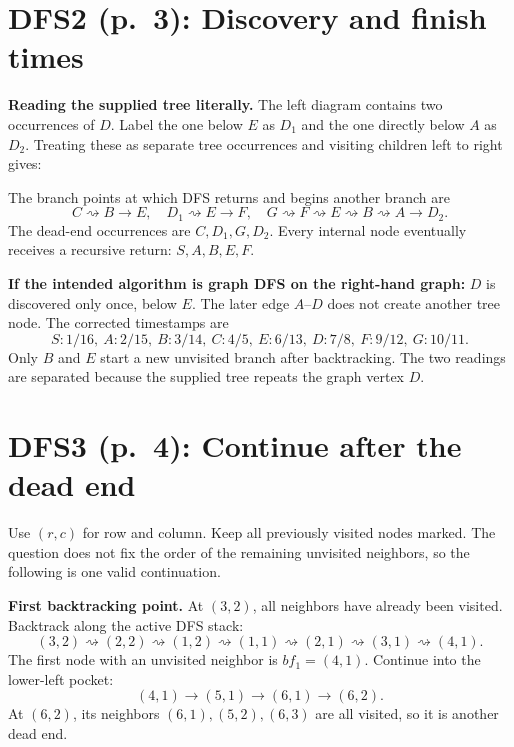 \documentclass[11pt,a4paper]{article}
\newcommand{\question}[2]{\section*{#1: #2}}
\begin{document}
\newpage
\question{DFS2 (p.\ 3)}{Discovery and finish times}
\textbf{Reading the supplied tree literally.} The left diagram contains two occurrences of $D$. Label the one below $E$ as $D_1$ and the one directly below $A$ as $D_2$. Treating these as separate tree occurrences and visiting children left to right gives:
\begin{center}\end{center}
The branch points at which DFS returns and begins another branch are
\[
C\rightsquigarrow\boxed{B}\to E,\quad D_1\rightsquigarrow\boxed{E}\to F,
\quad G\rightsquigarrow F\rightsquigarrow E\rightsquigarrow B\rightsquigarrow\boxed{A}\to D_2.
\]
The dead-end occurrences are $C,D_1,G,D_2$. Every internal node eventually receives a recursive return: $S,A,B,E,F$.

\textbf{If the intended algorithm is graph DFS on the right-hand graph:} $D$ is discovered only once, below $E$. The later edge $A$--$D$ does not create another tree node. The corrected timestamps are
\[
S:1/16,\ A:2/15,\ B:3/14,\ C:4/5,\ E:6/13,\ D:7/8,\ F:9/12,\ G:10/11.
\]
Only $B$ and $E$ start a new unvisited branch after backtracking. The two readings are separated because the supplied tree repeats the graph vertex $D$.

\newpage
\question{DFS3 (p.\ 4)}{Continue after the dead end}
Use $(r,c)$ for row and column. Keep all previously visited nodes marked. The question does not fix the order of the remaining unvisited neighbors, so the following is one valid continuation.

\textbf{First backtracking point.} At $(3,2)$, all neighbors have already been visited. Backtrack along the active DFS stack:
\[
(3,2)\rightsquigarrow(2,2)\rightsquigarrow(1,2)\rightsquigarrow(1,1)
\rightsquigarrow(2,1)\rightsquigarrow(3,1)\rightsquigarrow(4,1).
\]
The first node with an unvisited neighbor is $\boxed{bf_1=(4,1)}$. Continue into the lower-left pocket:
\[
(4,1)\to(5,1)\to(6,1)\to(6,2).
\]
At $(6,2)$, its neighbors $(6,1),(5,2),(6,3)$ are all visited, so it is another dead end.
\end{document}
